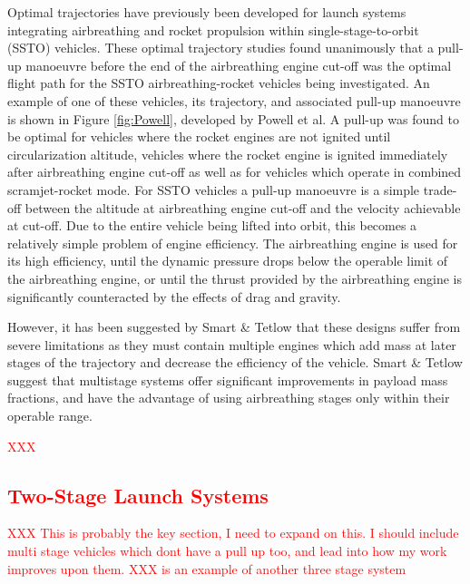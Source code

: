   	Optimal trajectories have previously been developed for launch systems integrating airbreathing and rocket propulsion within single-stage-to-orbit (SSTO) vehicles\cite{Powell1991,Lu1993,Trefny1999,Roche2000,Pescetelli2012,Young2006,Bradford2000}. These optimal trajectory studies found unanimously that a pull-up manoeuvre before the end of the airbreathing engine cut-off was the optimal flight path for the SSTO airbreathing-rocket vehicles being investigated. An example of one of these vehicles, its trajectory, and associated pull-up manoeuvre is shown in Figure \ref{fig:Powell}, developed by Powell et al\cite{Powell1991}. A pull-up was found to be optimal for vehicles where the rocket engines are not ignited until circularization altitude\cite{Powell1991,Lu1993}, vehicles where the rocket engine is ignited immediately after airbreathing engine cut-off\cite{Trefny1999,Roche2000,Pescetelli2012} as well as for vehicles which operate in combined scramjet-rocket mode\cite{Young2006,Bradford2000}. For SSTO vehicles a pull-up manoeuvre is a simple trade-off between the altitude at airbreathing engine cut-off and the velocity achievable at cut-off. Due to the entire vehicle being lifted into orbit, this becomes a relatively simple problem of engine efficiency. The airbreathing engine is used for its high efficiency, until the dynamic pressure drops below the operable limit of the airbreathing engine, or until the thrust provided by the airbreathing engine is significantly counteracted by the effects of drag and gravity. 
  	
  	
  	
  	 \textcolor{red}{}
  	However, it has been suggested by Smart \& Tetlow\cite{Smart2009} that these designs suffer from severe limitations as they must contain multiple engines which add mass at later stages of the trajectory and decrease the efficiency of the vehicle. Smart \& Tetlow suggest that multistage systems offer significant improvements in payload mass fractions, and have the advantage of using airbreathing stages only within their operable range.
  	
  \textcolor{red}{XXX 
  \subsection{Two-Stage Launch Systems}
}


\textcolor{red}{XXX This is probably the key section, I need to expand on this. I should include multi stage vehicles which dont have a pull up too, and lead into how my work improves upon them.}
\textcolor{red}{XXX \cite{Kimura1999} is an example of another three stage system}

